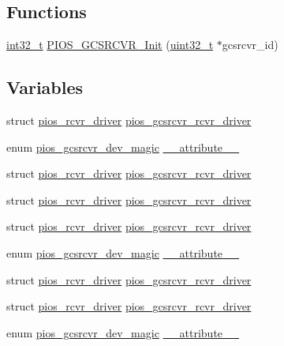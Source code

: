 \subsection*{Functions}
\begin{DoxyCompactItemize}
\item 
\hyperlink{group___n_a_m_e_gafd12020da5a235dfcf0c3c748fb5baed}{int32\-\_\-t} \hyperlink{group___p_i_o_s___g_c_s_r_c_v_r_ga58dd7d9c9bc500b52d54bc7bb5e9fd01}{P\-I\-O\-S\-\_\-\-G\-C\-S\-R\-C\-V\-R\-\_\-\-Init} (\hyperlink{stdint_8h_a435d1572bf3f880d55459d9805097f62}{uint32\-\_\-t} $\ast$gcsrcvr\-\_\-id)
\end{DoxyCompactItemize}
\subsection*{Variables}
\begin{DoxyCompactItemize}
\item 
struct \hyperlink{structpios__rcvr__driver}{pios\-\_\-rcvr\-\_\-driver} \hyperlink{group___p_i_o_s___g_c_s_r_c_v_r_ga6405e16bd59aa95205a0d825e3f0b31d}{pios\-\_\-gcsrcvr\-\_\-rcvr\-\_\-driver}
\item 
enum \hyperlink{group___p_i_o_s___g_c_s_r_c_v_r_ga88de96a8f2cf14a06395b79f0996c923}{pios\-\_\-gcsrcvr\-\_\-dev\-\_\-magic} \hyperlink{group___p_i_o_s___g_c_s_r_c_v_r_gac9a40b3462b5b1cedc9c9525b2c1f278}{\-\_\-\-\_\-attribute\-\_\-\-\_\-}
\item 
struct \hyperlink{structpios__rcvr__driver}{pios\-\_\-rcvr\-\_\-driver} \hyperlink{group___p_i_o_s___g_c_s_r_c_v_r_ga6405e16bd59aa95205a0d825e3f0b31d}{pios\-\_\-gcsrcvr\-\_\-rcvr\-\_\-driver}
\item 
struct \hyperlink{structpios__rcvr__driver}{pios\-\_\-rcvr\-\_\-driver} \hyperlink{group___p_i_o_s___g_c_s_r_c_v_r_ga6405e16bd59aa95205a0d825e3f0b31d}{pios\-\_\-gcsrcvr\-\_\-rcvr\-\_\-driver}
\item 
struct \hyperlink{structpios__rcvr__driver}{pios\-\_\-rcvr\-\_\-driver} \hyperlink{group___p_i_o_s___g_c_s_r_c_v_r_ga6405e16bd59aa95205a0d825e3f0b31d}{pios\-\_\-gcsrcvr\-\_\-rcvr\-\_\-driver}
\item 
enum \hyperlink{group___p_i_o_s___g_c_s_r_c_v_r_ga88de96a8f2cf14a06395b79f0996c923}{pios\-\_\-gcsrcvr\-\_\-dev\-\_\-magic} \hyperlink{group___p_i_o_s___g_c_s_r_c_v_r_gac9a40b3462b5b1cedc9c9525b2c1f278}{\-\_\-\-\_\-attribute\-\_\-\-\_\-}
\item 
struct \hyperlink{structpios__rcvr__driver}{pios\-\_\-rcvr\-\_\-driver} \hyperlink{group___p_i_o_s___g_c_s_r_c_v_r_ga6405e16bd59aa95205a0d825e3f0b31d}{pios\-\_\-gcsrcvr\-\_\-rcvr\-\_\-driver}
\item 
struct \hyperlink{structpios__rcvr__driver}{pios\-\_\-rcvr\-\_\-driver} \hyperlink{group___p_i_o_s___g_c_s_r_c_v_r_ga6405e16bd59aa95205a0d825e3f0b31d}{pios\-\_\-gcsrcvr\-\_\-rcvr\-\_\-driver}
\item 
enum \hyperlink{group___p_i_o_s___g_c_s_r_c_v_r_ga88de96a8f2cf14a06395b79f0996c923}{pios\-\_\-gcsrcvr\-\_\-dev\-\_\-magic} \hyperlink{group___p_i_o_s___g_c_s_r_c_v_r_gac9a40b3462b5b1cedc9c9525b2c1f278}{\-\_\-\-\_\-attribute\-\_\-\-\_\-}
\end{DoxyCompactItemize}


